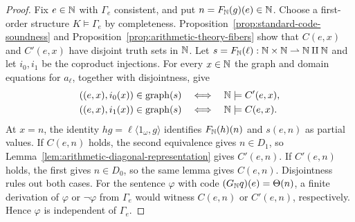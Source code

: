 \begin{proof}
Fix $e\in\mathbb N$ with $\Gamma_e$ consistent, and put
$n=F_{\mathbb N}(g)(e)\in\mathbb N$. Choose a first-order structure
$K\models\Gamma_e$ by completeness.
Proposition~\ref{prop:standard-code-soundness} and
Proposition~\ref{prop:arithmetic-theory-fibers} show that
$C(e,x)$ and $C'(e,x)$ have disjoint truth sets in $\mathbb N$.
Let $s=F_{\mathbb N}(\ell):\mathbb N\times\mathbb N\rightharpoonup\mathbb N\amalg\mathbb N$ and
let $i_0,i_1$ be the coproduct injections. For every $x\in\mathbb N$ the
graph and domain equations for $a_\ell$, together with disjointness, give
\[
 \begin{aligned}
 ((e,x),i_0(x))\in\operatorname{graph}(s)
     &\quad\Longleftrightarrow\quad \mathbb N\models C'(e,x),\\
 ((e,x),i_1(x))\in\operatorname{graph}(s)
     &\quad\Longleftrightarrow\quad \mathbb N\models C(e,x).
 \end{aligned}
\]
At $x=n$, the identity $hg=\ell\langle1_\omega,g\rangle$
identifies $F_{\mathbb N}(h)(n)$ and $s(e,n)$ as partial values.
If $C(e,n)$ holds, the second equivalence gives $n\in D_1$,
so Lemma~\ref{lem:arithmetic-diagonal-representation} gives
$C'(e,n)$. If $C'(e,n)$ holds, the first gives $n\in D_0$,
so the same lemma gives $C(e,n)$. Disjointness rules out both cases.
For the sentence $\varphi$ with code
$(G_{\mathbb N}q)(e)=\Theta(n)$, a finite derivation of $\varphi$ or
$\neg\varphi$ from $\Gamma_e$ would witness $C(e,n)$ or $C'(e,n)$,
respectively. Hence $\varphi$ is independent of $\Gamma_e$.
\end{proof}

